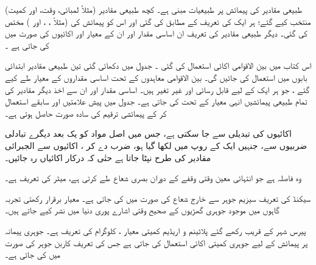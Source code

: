 طبیعی  مقادیر  کی پیمائش پر طبیعیات مبنی ہے۔ کچھ طبیعی مقادیر (مثلاً لمبائی، وقت، اور کمیت)   منتخب کیے گئے؛ ہر ایک کی تعریف   کے مطابق کی گئی  اور اس کو پیمائش کی  (مثلاً 
 ،  ، اور ) مختص کی گئی۔  دیگر طبیعی  مقادیر  کی تعریف ان اساسی  مقدار اور ان کے معیار اور اکائیوں کی صورت میں کی جاتی ہے ۔ 

اس کتاب میں بین الاقوامی اکائی    استعمال کی گئی ۔ جدول   میں دکھائی گئی تین طبیعی  مقادیر ابتدائی بابوں میں استعمال کی جائیں گی۔ بین الاقوامی معاہدوں کے تحت  اساسی مقداروں کے معیار طے کیے گئے ، جو ہر ایک کے لیے قابل رسائی اور غیر تغیر ہیں۔ اساسی مقدار اور ان سے اخذ دیگر مقادیر  کی تمام طبیعی پیمائشیں انہی معیار کے تحت کی جاتی ہے۔ جدول   میں پیش علامتیں اور سابقے استعمال کر کے پیمائشی ترقیم  کی سادہ صورت حاصل ہوتی  ہے۔ 

اکائیوں کی تبدیلی   سے  جا سکتی ہے، جس میں اصل مواد   کو یک بعد دیگرے تبادلی ضربیوں  سے، جنہیں  ایک  کے روپ میں لکھا گیا ہو، ضرب دے  کر ، اکائیوں سے الجبرائی مقادیر  کی طرح  نپٹا جاتا ہے حتٰی کہ درکار اکائیاں رہ جائیں۔

وہ فاصلہ ہے جو انتہائی معین وقتی وقفے  کے دوران  بصری شعاع    طے کرتی ہے، میٹر کی تعریف  ہے۔

سیکنڈ کی تعریف  سیزیم   جوہر سے خارج شعاع  کی صورت  میں کی جاتی ہے۔ معیار برقرار رکھتی  تجربہ  گاہوں میں موجود جوہری گھڑیوں کے  صحیح   وقتی اشارے پوری دنیا   میں نشر کیے جاتے ہیں۔

پیرس شہر کے قریب رکھے گئے  پلاٹینم  و  اریڈیم کمیتی معیار ،  کلوگرام  کی  تعریف  ہے۔ جوہری پیمانہ پر پیمائش کے لیے جوہری کمیتی  اکائی استعمال کی جاتی ہے جس کی تعریف کاربن    جوہر کی صورت میں کی جاتی ہے۔


